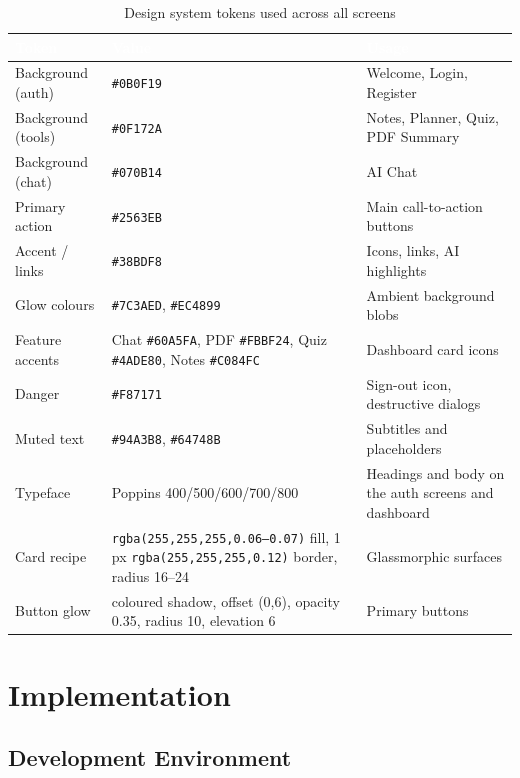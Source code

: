 \documentclass[12pt,a4paper,oneside]{report}
\begin{document}
\begin{table}[H]
\centering
\caption{Design system tokens used across all screens}
\label{tab:design}
\small
\begin{tabularx}{\textwidth}{@{}p{3.4cm}p{3.1cm}X@{}}
\toprule
\rowcolor{tblhead} \textcolor{white}{\textbf{Token}} &
\textcolor{white}{\textbf{Value}} &
\textcolor{white}{\textbf{Usage}} \\
\midrule
Background (auth)  & \texttt{\#0B0F19} & Welcome, Login, Register \\
Background (tools) & \texttt{\#0F172A} & Notes, Planner, Quiz, PDF Summary \\
Background (chat)  & \texttt{\#070B14} & AI Chat \\
Primary action     & \texttt{\#2563EB} & Main call-to-action buttons \\
Accent / links     & \texttt{\#38BDF8} & Icons, links, AI highlights \\
Glow colours       & \texttt{\#7C3AED}, \texttt{\#EC4899} & Ambient background blobs \\
Feature accents    & Chat \texttt{\#60A5FA}, PDF \texttt{\#FBBF24}, Quiz \texttt{\#4ADE80}, Notes \texttt{\#C084FC} & Dashboard card icons \\
Danger             & \texttt{\#F87171} & Sign-out icon, destructive dialogs \\
Muted text         & \texttt{\#94A3B8}, \texttt{\#64748B} & Subtitles and placeholders \\
Typeface           & Poppins 400/500/600/700/800 & Headings and body on the auth screens and dashboard \\
Card recipe        & \texttt{rgba(255,255,255,0.06--0.07)} fill, 1\,px \texttt{rgba(255,255,255,0.12)} border, radius 16--24 & Glassmorphic surfaces \\
Button glow        & coloured shadow, offset (0,6), opacity 0.35, radius 10, elevation 6 & Primary buttons \\
\bottomrule
\end{tabularx}
\end{table}

\chapter{Implementation}\label{ch:impl}

\section{Development Environment}
\end{document}
